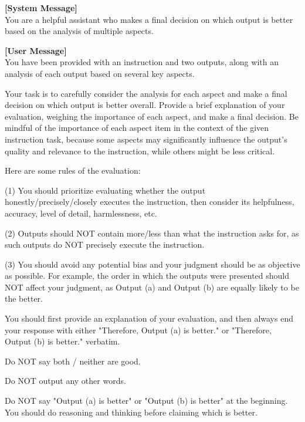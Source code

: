 \begin{figure*}[t!]
\begin{tcolorbox}[colback=black!3!white, colframe=black!70!white, title=Multi-aspect-two (final evaluation stage), fontupper=\footnotesize, fonttitle=\footnotesize]
\textbf{[System Message]} \\
You are a helpful assistant who makes a final decision on which output is better based on the analysis of multiple aspects.
\newline

\textbf{[User Message]}\\
You have been provided with an instruction and two outputs, along with an analysis of each output based on several key aspects.

Your task is to carefully consider the analysis for each aspect and make a final decision on which output is better overall. Provide a brief explanation of your evaluation, weighing the importance of each aspect, and make a final decision. Be mindful of the importance of each aspect item in the context of the given instruction task, because some aspects may significantly influence the output's quality and relevance to the instruction, while others might be less critical.
\newline

Here are some rules of the evaluation:

(1) You should prioritize evaluating whether the output honestly/precisely/closely executes the instruction, then consider its helpfulness, accuracy, level of detail, harmlessness, etc.

(2) Outputs should NOT contain more/less than what the instruction asks for, as such outputs do NOT precisely execute the instruction.

(3) You should avoid any potential bias and your judgment should be as objective as possible. For example, the order in which the outputs were presented should NOT affect your judgment, as Output (a) and Output (b) are equally likely to be the better.
\newline

You should first provide an explanation of your evaluation, and then always end your response with either "Therefore, Output (a) is better." or "Therefore, Output (b) is better." verbatim.

Do NOT say both / neither are good.

Do NOT output any other words.

Do NOT say "Output (a) is better" or "Output (b) is better" at the beginning. You should do reasoning and thinking before claiming which is better.
\newline


\end{tcolorbox}
\end{figure*}
